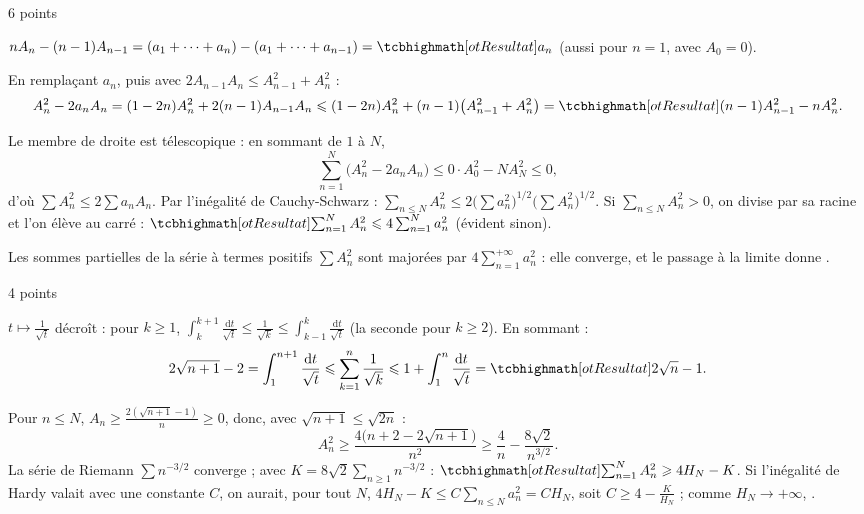 
\enParties

\begin{corrigeEval}{6 points}{}
\begin{questions}
  \item $nA_n-(n-1)A_{n-1}=(a_1+\dots+a_n)-(a_1+\dots+a_{n-1})=\res{a_n}$
    (aussi pour $n=1$, avec $A_0=0$). 
  \item En remplaçant $a_n$, puis avec $2A_{n-1}A_n\leqslant A_{n-1}^{2}+A_n^{2}$ :
    \[A_n^{2}-2a_nA_n=(1-2n)A_n^{2}+2(n-1)A_{n-1}A_n
      \leqslant(1-2n)A_n^{2}+(n-1)\bigl(A_{n-1}^{2}+A_n^{2}\bigr)
      =\res{(n-1)A_{n-1}^{2}-nA_n^{2}}.\]
  \item Le membre de droite est télescopique : en sommant de $1$ à $N$,
    \[\sum_{n=1}^{N}\bigl(A_n^{2}-2a_nA_n\bigr)\leqslant0\cdot A_0^{2}-NA_N^{2}\leqslant0,\]
    d'où $\sum A_n^{2}\leqslant2\sum a_nA_n$. Par l'inégalité de
    Cauchy-Schwarz :
    $\sum_{n\leqslant N}A_n^{2}\leqslant2\bigl(\sum a_n^{2}\bigr)^{1/2}\bigl(\sum A_n^{2}\bigr)^{1/2}$.
    Si $\sum_{n\leqslant N}A_n^{2}>0$, on divise par sa racine et l'on
    élève au carré :
    $\res{\sum_{n=1}^{N}A_n^{2}\leqslant4\sum_{n=1}^{N}a_n^{2}}$ (évident
    sinon). 
  \item Les sommes partielles de la série à termes positifs $\sum A_n^{2}$
    sont majorées par $4\sum_{n=1}^{+\infty}a_n^{2}$ : elle converge, et le
    passage à la limite donne . 
\end{questions}
\end{corrigeEval}

\begin{corrigeEval}{4 points}{}
\begin{questions}[start=5]
  \item $t\mapsto\frac{1}{\sqrt t}$ décroît : pour $k\geqslant1$,
    $\int_k^{k+1}\frac{\mathrm{d}t}{\sqrt t}\leqslant\frac{1}{\sqrt k}\leqslant\int_{k-1}^{k}\frac{\mathrm{d}t}{\sqrt t}$
    (la seconde pour $k\geqslant2$). En sommant :
    \[2\sqrt{n+1}-2=\int_1^{n+1}\frac{\mathrm{d}t}{\sqrt t}\leqslant\sum_{k=1}^{n}\frac{1}{\sqrt k}
      \leqslant1+\int_1^{n}\frac{\mathrm{d}t}{\sqrt t}=\res{2\sqrt n-1}.\]
  \item Pour $n\leqslant N$, $A_n\geqslant\frac{2(\sqrt{n+1}-1)}{n}\geqslant0$, donc,
    avec $\sqrt{n+1}\leqslant\sqrt{2n}$ :
    \[A_n^{2}\geqslant\frac{4\bigl(n+2-2\sqrt{n+1}\bigr)}{n^{2}}\geqslant\frac4n-\frac{8\sqrt2}{n^{3/2}}.\]
    La série de Riemann $\sum n^{-3/2}$ converge ; avec
    $K=8\sqrt2\sum_{n\geqslant1}n^{-3/2}$ :
    $\res{\sum_{n=1}^{N}A_n^{2}\geqslant4H_N-K}$. Si l'inégalité de Hardy
    valait avec une constante $C$, on aurait, pour tout $N$,
    $4H_N-K\leqslant C\sum_{n\leqslant N}a_n^{2}=CH_N$, soit
    $C\geqslant4-\frac{K}{H_N}$ ; comme $H_N\to+\infty$, .
\end{questions}
\end{corrigeEval}

